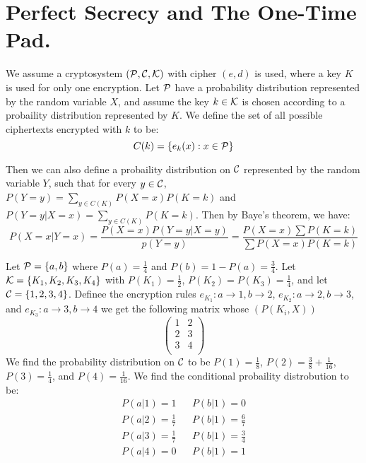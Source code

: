 
\section{Perfect Secrecy and The One-Time Pad.}
\label{section1}

We assume a cryptosystem $(\mathcal{P},\mathcal{C},\mathcal{K})$ with cipher $(e,d)$ is used, where a
key $K$ is used for only one encryption. Let  $\mathcal{P}$ have a probability
distribution represented by the random variable  $X$, and assume the key $k \in
\mathcal{K}$ is chosen according to a probaility distribution represented by $K$. We
define the set of all possible ciphertexts encrypted with  $k$ to be:
\begin{equation}
    C(k)=\{e_k(x) : x \in \mathcal{P}\}
\end{equation}

Then we can also define a probaility distribution on $\mathcal{C}$ represented by the
random variable $Y$, such that for every $y \in \mathcal{C}$,  $P(Y=y)=\sum_{y
\in C(K)}{P(X=x)P(K=k)}$ and
$P(Y=y|X=x)=\sum_{y \in C(K)}{P(K=k)}$. Then by Baye's theorem, we have:
\begin{equation}
    P(X=x|Y=x)=\frac{P(X=x)P(Y=y|X=y)}{p(Y=y)}=\frac{P(X=x)\sum{P(K=k)}}{\sum{P(X=x)
    P(K=k)}}
\end{equation}

\begin{example}
    Let $\mathcal{P}=\{a,b\}$ where $P(a)=\frac{1}{4}$ and $P(b)=1-P(a)=\frac{3}{4}$.
    Let $\mathcal{K}=\{K_1,K_2,K_3,K_4\}$ with $P(K_1)=\frac{1}{2}$,
    $P(K_2)=P(K_3)=\frac{1}{4}$, and let $\mathcal{C}=\{1,2,3,4\}$. Definee the
    encryption rules $e_{K_1}:a \rightarrow 1,b \rightarrow 2$, $e_{K_2}:a
    \rightarrow 2, b \rightarrow 3$, and $e_{K_3}:a \rightarrow 3, b \rightarrow
    4$ we get the following matrix whose $(P(K_i,X))$
    \begin{equation*}
        \begin{pmatrix}
            1   &   2   \\
            2   &   3   \\
            3   &   4   \\
        \end{pmatrix}
    \end{equation*}
    We find the probability distribution on $\mathcal{C}$ to be  $P(1)=\frac{1}{8}$,
    $P(2)=\frac{3}{8}+\frac{1}{16}$, $P(3)=\frac{1}{4}$, and
    $P(4)=\frac{1}{16}$. We find the conditional probaility distrobution to be:
    \begin{align*}
        P(a|1)=1                &&  P(b|1)=0                \\
        P(a|2)=\frac{1}{7}      &&  P(b|1)=\frac{6}{7}      \\
        P(a|3)=\frac{1}{7}      &&  P(b|1)=\frac{3}{4}      \\
        P(a|4)=0                &&  P(b|1)=1                \\
    \end{align*}
\end{example}

